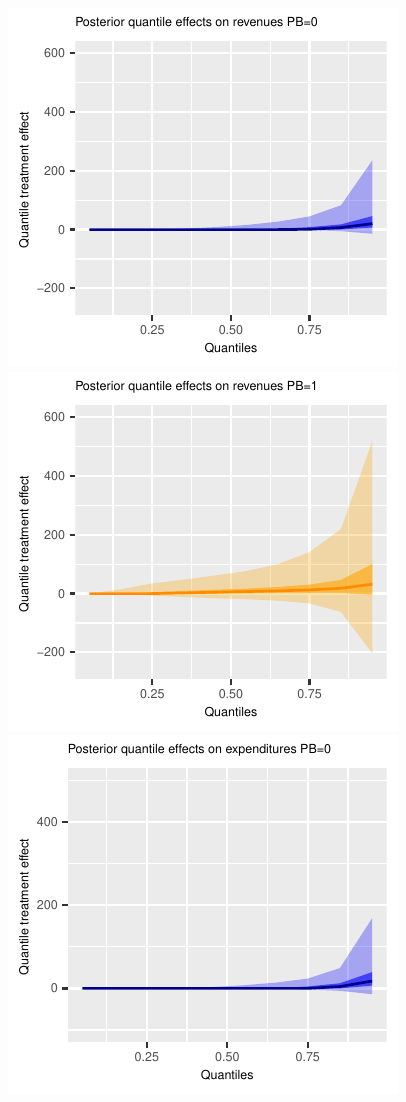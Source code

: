 \documentclass[AER]{AEA}
\begin{document}
\begin{figure}[h!]
    \includegraphics{posterior_parent_quantile_TEs_revenues_pb_0_lognormal.pdf}
    \includegraphics{posterior_parent_quantile_TEs_revenues_pb_1_lognormal.pdf}\\
    \includegraphics{posterior_parent_quantile_TEs_expenditures_pb_0_lognormal.pdf}

\end{figure}
\end{document}
